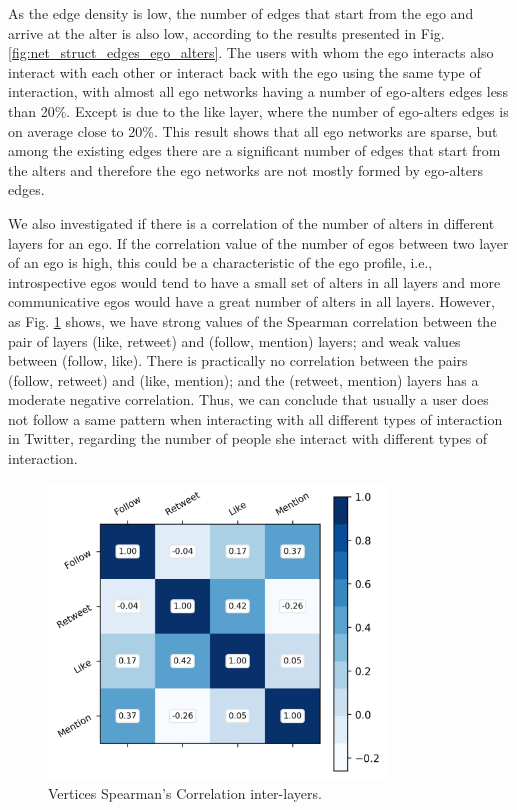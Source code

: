 As the edge density is low, the number of edges that start from the ego and arrive at the alter is also low, according to the results presented in Fig. \ref{fig:net_struct_edges_ego_alters}. The users with whom the ego interacts also interact with each other or interact back with the ego using the same type of interaction, with almost all ego networks having a number of ego-alters edges less than 20\%. Except is due to the like layer, where the number of ego-alters edges is on average close to 20\%. This result shows that all ego networks are sparse, but among the existing edges there are a significant number of edges that start from the alters and therefore the ego networks are not mostly formed by ego-alters edges.

We also investigated if there is a correlation of the number of alters in different layers for an ego. If the correlation value of the number of egos between two layer of an ego is high, this could be a characteristic of the ego profile, i.e., introspective egos would tend to have a small set of alters in all layers and more communicative egos would have a great number of alters in all layers. However, as Fig. \ref{fig:net_struct_nodes_correlation} shows, we have strong values of the Spearman correlation between the pair of layers (like, retweet) and  (follow, mention) layers; and weak values between (follow, like). There is practically no correlation between the pairs (follow, retweet) and (like, mention); and the (retweet, mention) layers has a moderate negative correlation. Thus, we can conclude that usually a user does not follow a same pattern when interacting with all different types of interaction in Twitter, regarding the number of people she interact with different types of interaction.

\begin{figure}[h!tb]
    \centering
    \includegraphics[width=0.8\textwidth]{fig/net_struct/nodes_correlation_spearman.png}
    \caption{Vertices Spearman's Correlation inter-layers.}
    \label{fig:net_struct_nodes_correlation}
\end{figure}

